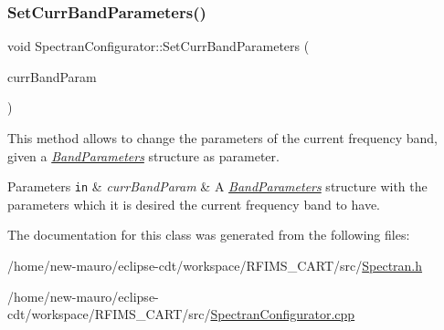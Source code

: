 \subsubsection{\texorpdfstring{Set\+Curr\+Band\+Parameters()}{SetCurrBandParameters()}}
{\footnotesize\ttfamily void Spectran\+Configurator\+::\+Set\+Curr\+Band\+Parameters (\begin{DoxyParamCaption}\item[{const \hyperlink{structBandParameters}{Band\+Parameters} \&}]{curr\+Band\+Param }\end{DoxyParamCaption})\hspace{0.3cm}{\ttfamily [inline]}}



This method allows to change the parameters of the current frequency band, given a {\itshape \hyperlink{structBandParameters}{Band\+Parameters}} structure as parameter. 


\begin{DoxyParams}[1]{Parameters}
\mbox{\tt in}  & {\em curr\+Band\+Param} & A {\itshape \hyperlink{structBandParameters}{Band\+Parameters}} structure with the parameters which it is desired the current frequency band to have. \\
\hline
\end{DoxyParams}


The documentation for this class was generated from the following files\+:\begin{DoxyCompactItemize}
\item 
/home/new-\/mauro/eclipse-\/cdt/workspace/\+R\+F\+I\+M\+S\+\_\+\+C\+A\+R\+T/src/\hyperlink{Spectran_8h}{Spectran.\+h}\item 
/home/new-\/mauro/eclipse-\/cdt/workspace/\+R\+F\+I\+M\+S\+\_\+\+C\+A\+R\+T/src/\hyperlink{SpectranConfigurator_8cpp}{Spectran\+Configurator.\+cpp}\end{DoxyCompactItemize}
